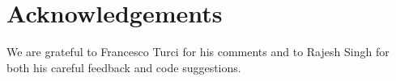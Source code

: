 \section*{Acknowledgements}
We are grateful to Francesco Turci for his comments and to Rajesh Singh for both his careful feedback and code suggestions. 



